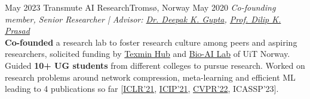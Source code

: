 \begin{experiences}


  \emptySeparator
  \researchexperience
    {May 2023}   {Transmute AI Research}{Tromsø, Norway}{}
    {May 2020} {\textit{Co-founding member, Senior Researcher | Advisor: \href{https://dkgupta90.github.io/}{Dr. Deepak K. Gupta}, \href{https://sites.google.com/site/dilipprasad/}{Prof. Dilip K. Prasad}}\\
    \textbf{Co-founded} a research lab to foster research culture among peers and aspiring researchers, solicited funding by \href{https://texmin.in/}{Texmin Hub} and \href{https://www.bioailab.org/}{Bio-AI Lab} of UiT Norway. \newline
    Guided \textbf{10+ UG students} from different colleges to pursue research. \newline
    Worked on research problems around network compression, meta-learning and efficient ML leading to 4 publications so far [\hyperref[C1]{ICLR'21}, \hyperref[C2]{ICIP'21}, \hyperref[C4]{CVPR'22}, ICASSP'23].
    }
  \emptySeparator
          
\end{experiences}
\vspace{-2mm}
